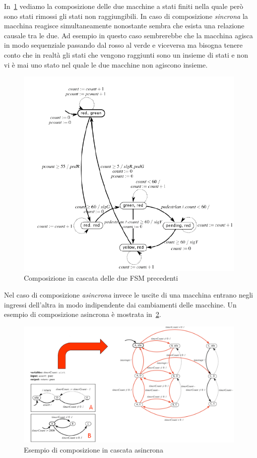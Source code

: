 In \figurename\,\ref{fig:semaforocomp} vediamo la composizione delle due macchine a stati finiti nella quale però sono stati rimossi gli stati non raggiungibili. In caso di composizione \emph{sincrona} la macchina reagisce simultaneamente nonostante sembra che esista una relazione causale tra le due. Ad esempio in questo caso sembrerebbe che la macchina agisca in modo sequenziale passando dal rosso al verde e viceversa ma bisogna tenere conto che in realtà gli stati che vengono raggiunti sono un insieme di stati e non vi è mai uno stato nel quale le due macchine non agiscono insieme.\\
\begin{figure}
\centering
\includegraphics[scale=0.6]{img/semaforocomp.png}
\caption{Composizione in cascata delle due FSM precedenti}\label{fig:semaforocomp}
\end{figure}
Nel caso di composizione \emph{asincrona} invece le uscite di una macchina entrano negli ingressi dell'altra in modo indipendente dai cambiamenti delle macchine. Un esempio di composizione asincrona è mostrata in \figurename\,\ref{fig:cascadeasincrona}.\\
\begin{figure}
\centering
\includegraphics[scale=0.4]{img/cascadeasincrona.png}
\caption{Esempio di composizione in cascata asincrona}\label{fig:cascadeasincrona}
\end{figure}
